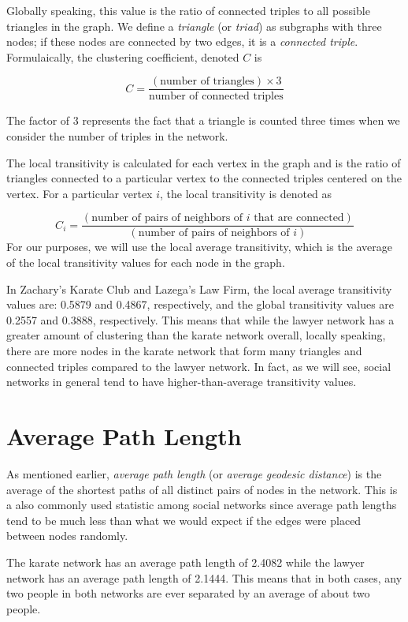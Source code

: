\documentclass[12pt,twoside]{amherstthesis}
\begin{document}
  Globally speaking, this value is the ratio of connected triples to all
  possible triangles in the graph. We define a \emph{triangle} (or
  \emph{triad}) as subgraphs with three nodes; if these nodes are
  connected by two edges, it is a \emph{connected triple}. Formulaically,
  the clustering coefficient, denoted \(C\) is
  
  \[C = \frac {(\text{number of triangles}) \times 3} {\text{number of connected triples}} \]
  
  The factor of \(3\) represents the fact that a triangle is counted three
  times when we consider the number of triples in the network.
  
  The local transitivity is calculated for each vertex in the graph and is
  the ratio of triangles connected to a particular vertex to the connected
  triples centered on the vertex. For a particular vertex \(i\), the local
  transitivity is denoted as
  
  \[ C_{i} = \frac {(\text{number of pairs of neighbors of } i \text{ that are connected})} {(\text{number of pairs of neighbors of } i)} \]
  For our purposes, we will use the local average transitivity, which is
  the average of the local transitivity values for each node in the graph.
  
  In Zachary's Karate Club and Lazega's Law Firm, the local average
  transitivity values are: 0.5879 and 0.4867, respectively, and the global
  transitivity values are 0.2557 and 0.3888, respectively. This means that
  while the lawyer network has a greater amount of clustering than the
  karate network overall, locally speaking, there are more nodes in the
  karate network that form many triangles and connected triples compared
  to the lawyer network. In fact, as we will see, social networks in
  general tend to have higher-than-average transitivity values.
  
  \section{Average Path Length}\label{average-path-length}
  
  As mentioned earlier, \emph{average path length} (or \emph{average
  geodesic distance}) is the average of the shortest paths of all distinct
  pairs of nodes in the network. This is a also commonly used statistic
  among social networks since average path lengths tend to be much less
  than what we would expect if the edges were placed between nodes
  randomly.
  
  The karate network has an average path length of 2.4082 while the lawyer
  network has an average path length of 2.1444. This means that in both
  cases, any two people in both networks are ever separated by an average
  of about two people.
  
\end{document}
